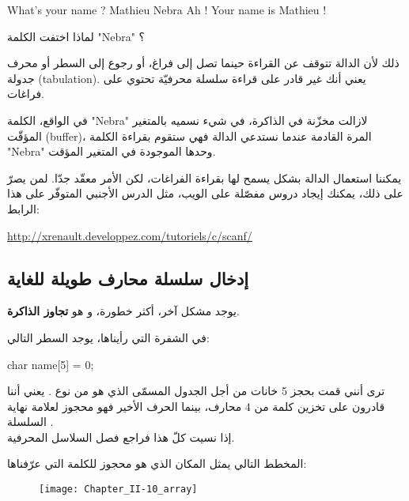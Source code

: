 \begin{Console}
What's your name ? Mathieu Nebra
Ah ! Your name is Mathieu !
\end{Console}

\begin{question}
لماذا اختفت الكلمة
"\textenglish{Nebra}"
؟
\end{question}

ذلك لأن الدالة
تتوقف عن القراءة حينما تصل إلى فراغ، أو رجوع إلى السطر أو محرف جدولة
(\textenglish{tabulation}).
يعني أنك غير قادر على قراءة سلسلة محرفيّة تحتوي على فراغات.

\begin{information}
  في الواقع، الكلمة
  "\textenglish{Nebra}"
  لازالت مخزّنة في الذاكرة، في  شيء نسميه بالمتغير المؤقّت
  (\textenglish{buffer})،
  المرة القادمة عندما نستدعي الدالة
  فهي ستقوم بقراءة الكلمة
  "\textenglish{Nebra}"
    وحدها الموجودة في المتغير المؤقت.
\end{information}

يمكننا استعمال الدالة
بشكل يسمح لها بقراءة الفراغات، لكن الأمر معقّد جدّا. لمن يصرّ على ذلك، يمكنك إيجاد دروس مفصّلة على الويب، مثل الدرس الأجنبي المتوفّر على هذا الرابط:

\url{http://xrenault.developpez.com/tutoriels/c/scanf/}

\subsection{إدخال سلسلة محارف طويلة للغاية}

يوجد مشكل آخر، أكثر خطورة، و هو
\textbf{تجاوز الذاكرة}.

في الشفرة التي رأيناها، يوجد السطر التالي:

\begin{Csource}
char name[5] = {0};
\end{Csource}

ترى أنني قمت بحجز 5 خانات من أجل الجدول المسمّى
الذي هو من نوع
.
يعني أننا قادرون على تخزين كلمة من 4 محارف، بينما الحرف الأخير فهو محجوز لعلامة نهاية السلسلة
.\\
إذا نسيت كلّ هذا فراجع فصل السلاسل المحرفية.

المخطط التالي يمثل المكان الذي هو محجوز للكلمة التي عرّفناها:

\begin{figure}[H]
	\centering
	\texttt{[image: Chapter\_II-10\_array]}
\end{figure}

